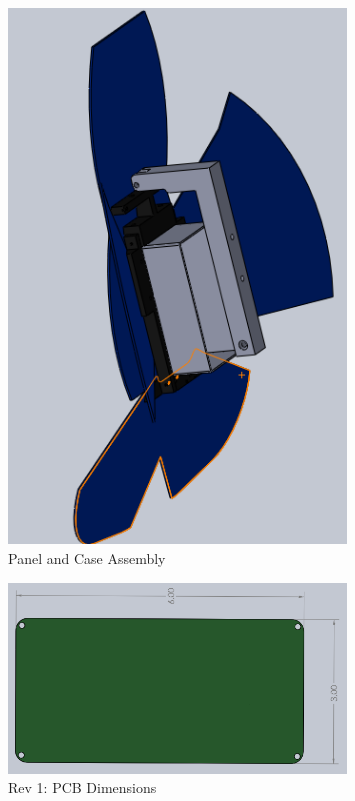 \documentclass{article}
\numberwithin{figure}{section}
\numberwithin{equation}{section}
\begin{document}
{\begin{figure}[H]
	\centering
	\includegraphics[width=0.8\textwidth]{NewAssembly2}
	\caption{Panel and Case Assembly}
	\label{fig:append_panel_case_assembly}
\end{figure}

\begin{figure}[H]
	\centering
	\includegraphics[width=0.8\textwidth]{PCB}
	\caption{Rev 1: PCB Dimensions}
	\label{fig:append_pcbdimensions}
\end{figure}

}
\end{document}
